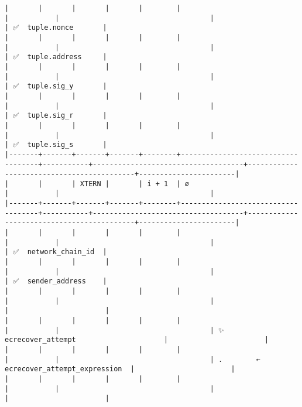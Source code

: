 \documentclass[varwidth=\maxdimen,margin=0.5cm,multi={verbatim}]{standalone}
\begin{document}
\begin{verbatim}
|       |       |       |       |        |                                    |           |                                    |                                           | ✅  tuple.nonce       |
|       |       |       |       |        |                                    |           |                                    |                                           | ✅  tuple.address     |
|       |       |       |       |        |                                    |           |                                    |                                           | ✅  tuple.sig_y       |
|       |       |       |       |        |                                    |           |                                    |                                           | ✅  tuple.sig_r       |
|       |       |       |       |        |                                    |           |                                    |                                           | ✅  tuple.sig_s       |
|-------+-------+-------+-------+--------+------------------------------------+-----------+------------------------------------+-------------------------------------------+-----------------------|
|       |       | XTERN |       | i + 1  | ∅                                  |           |                                    |
|-------+-------+-------+-------+--------+------------------------------------+-----------+------------------------------------+-------------------------------------------+-----------------------|
|       |       |       |       |        |                                    |           |                                    |                                           | ✅  network_chain_id  |
|       |       |       |       |        |                                    |           |                                    |                                           | ✅  sender_address    |
|       |       |       |       |        |                                    |           |                                    |                                           |                       |
|       |       |       |       |        |                                    |           |                                    | ✨  ecrecover_attempt                     |                       |
|       |       |       |       |        |                                    |           |                                    | .        ←  ecrecover_attempt_expression  |                       |
|       |       |       |       |        |                                    |           |                                    |                                           |                       |

\end{verbatim}
\end{document}
